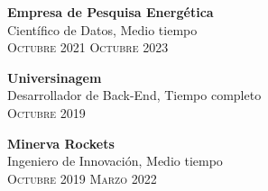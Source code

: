 \documentclass[oneside]{article}
\begin{document}
{\begin{minipage}[t][\dimexpr\textheight-2\fboxrule-2\fboxsep\relax][t]{\dimexpr0.6\textwidth-2\fboxrule-2\fboxsep\relax}
        {\large \textbf{Empresa de Pesquisa Energética}} \\
        {{\selectfont Científico de Datos, Medio tiempo}} \\
        {\scshape{}\selectfont\footnotesize Octubre 2021 \textendash{} Octubre 2023} 
        \vspace{.3cm}

        {\large \textbf{Universinagem}}\\
        {{\selectfont Desarrollador de Back-End, Tiempo completo}}\\
        {\scshape{}\selectfont\footnotesize Octubre 2019 \textendash{} } 
        \vspace{.3cm}

        {\large \textbf{Minerva Rockets}}\\
        {{\selectfont Ingeniero de Innovación, Medio tiempo}}\\
        {\scshape{}\selectfont\footnotesize Octubre 2019 \textendash{} Marzo 2022} 
        \vspace{.3cm}

\end{minipage}}
\end{document}
